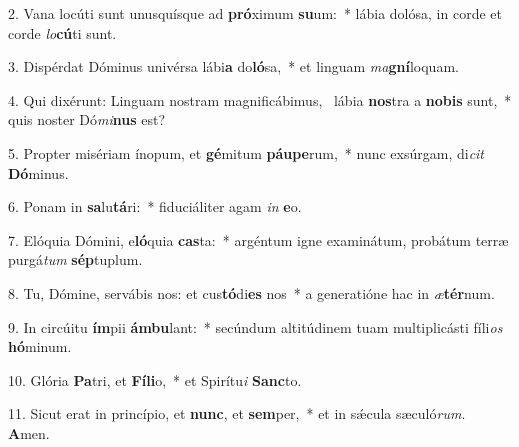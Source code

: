 2. Vana locúti sunt unusquísque ad \textbf{pró}ximum \textbf{su}um:~*  lábia dolósa, in corde et corde \textit{lo}\textbf{cú}ti sunt.\

3. Dispérdat Dóminus univérsa lábi\textbf{a} do\textbf{ló}sa,~*  et linguam \textit{ma}\textbf{gní}loquam.\

4. Qui dixérunt: Linguam nostram magnificábimus, \dag\  lábia \textbf{nos}tra a \textbf{no}\textbf{bis} sunt,~*  quis noster Dó\textit{mi}\textbf{nus} est?\

5. Propter misériam ínopum, et \textbf{gé}mitum \textbf{páu}\textbf{pe}rum,~*  nunc exsúrgam, di\textit{cit} \textbf{Dó}minus.\

6. Ponam in \textbf{sa}lu\textbf{tá}ri:~*  fiduciáliter agam \textit{in} \textbf{e}o.\

7. Elóquia Dómini, e\textbf{ló}quia \textbf{cas}ta:~*  argéntum igne examinátum, probátum terræ purgá\textit{tum} \textbf{sép}tuplum.\

8. Tu, Dómine, servábis nos: et cus\textbf{tó}di\textbf{es} nos~*  a generatióne hac in \textit{æ}\textbf{tér}num.\

9. In circúitu \textbf{ím}pii \textbf{ám}\textbf{bu}lant:~*  secúndum altitúdinem tuam multiplicásti fíli\textit{os} \textbf{hó}minum.\

10. Glória \textbf{Pa}tri, et \textbf{Fí}\textbf{li}o,~*  et Spirítu\textit{i} \textbf{Sanc}to.\

11. Sicut erat in princípio, et \textbf{nunc}, et \textbf{sem}per,~*  et in sǽcula sæculó\textit{rum}. \textbf{A}men.\

